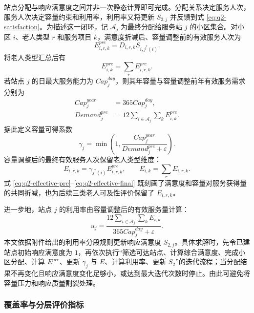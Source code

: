 站点分配与响应满意度之间并非一次静态计算即可完成。分配关系决定服务人次，服务人次决定容量约束和利用率，利用率又将更新 $S_{2,j}$ 并反馈到式 \eqref{eq:q2-satisfaction}。为描述这一闭环，记 $\mathcal{A}_j$ 为最终分配给服务站 $j$ 的小区集合。对小区 $i$、老人类型 $r$ 和服务项目 $k$，满意度折减后、容量调整前的有效服务人次为
\begin{equation}
  E_{i,r,k}^{pre}=D_{i,r,k}S_{i,j^*(i)}.
  \label{eq:q2-effective-pre}
\end{equation}
将老人类型汇总后有
\begin{equation}
  E_{i,k}^{pre}=\sum_rE_{i,r,k}^{pre}.
  \label{eq:q2-effective-pre-service}
\end{equation}
若站点 $j$ 的日最大服务能力为 $Cap_j^{day}$，则其年容量与容量调整前年有效服务需求分别为
\begin{align}
  Cap_j^{year}&=365Cap_j^{day}, \label{eq:q2-annual-capacity}\\
  Demand_j^{pre}&=12\sum_{i\in \mathcal{A}_j}\sum_kE_{i,k}^{pre}. \label{eq:q2-pre-demand}
\end{align}
据此定义容量可得系数
\begin{equation}
  \gamma_j=
  \min\left(
    1,\frac{Cap_j^{year}}{Demand_j^{pre}+\varepsilon}
  \right).
  \label{eq:q2-gamma}
\end{equation}
容量调整后的最终有效服务人次保留老人类型维度：
\begin{equation}
  E_{i,r,k}=\gamma_{j^*(i)}E_{i,r,k}^{pre},
  \qquad
  E_{i,k}=\sum_rE_{i,r,k}.
  \label{eq:q2-effective-final}
\end{equation}
式 \eqref{eq:q2-effective-pre}--\eqref{eq:q2-effective-final} 既刻画了满意度和容量对服务获得量的共同折减，也为后续三类老人可及性评价保留了 $E_{i,r,k}$。

进一步地，站点 $j$ 的利用率由容量调整后的有效服务量计算：
\begin{equation}
  u_j=
  \frac{12\sum_{i\in \mathcal{A}_j}\sum_kE_{i,k}}
  {365Cap_j^{day}+\varepsilon}.
  \label{eq:q2-utilization}
\end{equation}
本文依据附件给出的利用率分段规则更新响应满意度 $S_{2,j}$。具体求解时，先令已建站点初始响应满意度为 $1$，再依次执行“筛选可达站点、计算综合满意度、完成小区分配、计算 $E^{pre}$、更新 $\gamma_j$ 与 $E$、计算利用率、更新 $S_2$”的迭代流程；当分配结果不再变化且响应满意度变化足够小，或达到最大迭代次数时停止。由此可避免将容量压力和响应质量割裂处理。

\subsubsection{覆盖率与分层评价指标}

